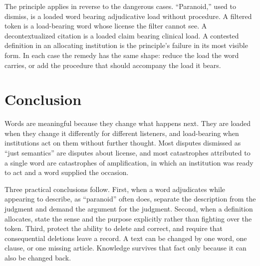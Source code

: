 \documentclass[11pt,a4paper]{article}
\theoremstyle{plain}
\theoremstyle{definition}
\theoremstyle{remark}
\begin{document}
The principle applies in reverse to the dangerous cases. ``Paranoid,'' used to dismiss, is a loaded word bearing adjudicative load without procedure. A filtered token is a load-bearing word whose license the filter cannot see. A decontextualized citation is a loaded claim bearing clinical load. A contested definition in an allocating institution is the principle's failure in its most visible form. In each case the remedy has the same shape: reduce the load the word carries, or add the procedure that should accompany the load it bears.

\section{Conclusion}

Words are meaningful because they change what happens next. They are loaded when they change it differently for different listeners, and load-bearing when institutions act on them without further thought. Most disputes dismissed as ``just semantics'' are disputes about license, and most catastrophes attributed to a single word are catastrophes of amplification, in which an institution was ready to act and a word supplied the occasion.

Three practical conclusions follow. First, when a word adjudicates while appearing to describe, as ``paranoid'' often does, separate the description from the judgment and demand the argument for the judgment. Second, when a definition allocates, state the sense and the purpose explicitly rather than fighting over the token. Third, protect the ability to delete and correct, and require that consequential deletions leave a record. A text can be changed by one word, one clause, or one missing article. Knowledge survives that fact only because it can also be changed back.
\end{document}
